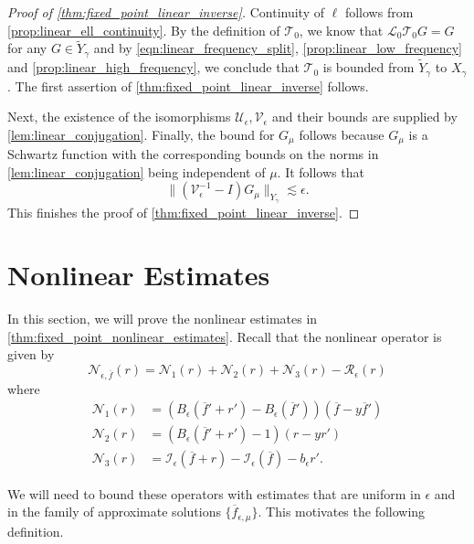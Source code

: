 \documentclass[11pt]{amsart}
\theoremstyle{definition}
\theoremstyle{remark}
\numberwithin{equation}{section}
\newcommand{\sq}[1]{\widetilde{#1}}
\newcommand{\mc}[1]{\mathcal{#1}}
\newcommand{\ov}[1]{\overline{#1}}
\begin{document}
\begin{proof}[Proof of \cref{thm:fixed_point_linear_inverse}]
Continuity of $\ell$ follows from \cref{prop:linear_ell_continuity}.
By the definition of $\mc{T}_0$, we know that $\mc{L}_0\mc{T}_0 G = G$ for any $G \in \sq{Y}_\gamma$ and by \eqref{eqn:linear_frequency_split}, \cref{prop:linear_low_frequency} and \cref{prop:linear_high_frequency}, we conclude that $\mc{T}_0$ is bounded from $\sq{Y}_{\gamma}$ to $X_\gamma$. The first assertion of \cref{thm:fixed_point_linear_inverse} follows. \par
Next, the existence of the isomorphisms $\mc{U}_\epsilon, \mc{V}_\epsilon$ and their bounds are supplied by \cref{lem:linear_conjugation}. Finally, the bound for $G_\mu$ follows because $G_\mu$ is a Schwartz function with the corresponding bounds on the norms in \cref{lem:linear_conjugation} being independent of $\mu$. It follows that
\[\|(\mc{V}_\epsilon^{-1} - I)G_\mu\|_{Y_\gamma} \lesssim \epsilon.\]
This finishes the proof of \cref{thm:fixed_point_linear_inverse}.
\end{proof}


\section{Nonlinear Estimates}\label{sec:nonlinear_estimates}

In this section, we will prove the nonlinear estimates in \cref{thm:fixed_point_nonlinear_estimates}. Recall that the nonlinear operator is given by 
\[\mc{N}_{\epsilon, \ov{f}}(r) = \mc{N}_1(r) + \mc{N}_2(r) + \mc{N}_3(r) - \mc{R}_\epsilon(r)\]
where 
\begin{equation}\label{eq:nonlinear_decomposition}
\begin{aligned}
    \mc{N}_1(r) & = (B_\epsilon(\ov{f}' + r') - B_\epsilon(\ov{f}'))\left(\ov{f} - y \ov{f}'\right) \\
    \mc{N}_2(r) & = (B_\epsilon(\ov{f}' + r') - 1)\left(r - y r'\right) \\
    \mc{N}_3(r) & = \mc{I}_\epsilon(\ov{f} + r) - \mc{I}_\epsilon(\ov{f}) - b_\epsilon r'.
\end{aligned}
\end{equation}

We will need to bound these operators with estimates that are uniform in $\epsilon$ and in the family of approximate solutions $\{\ov{f}_{\epsilon, \mu}\}$. This motivates the following definition.
\end{document}
